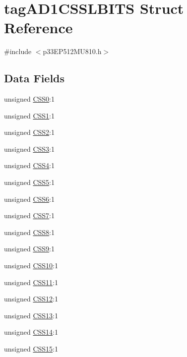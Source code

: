 \hypertarget{structtag_a_d1_c_s_s_l_b_i_t_s}{}\section{tag\+A\+D1\+C\+S\+S\+L\+B\+I\+TS Struct Reference}
\label{structtag_a_d1_c_s_s_l_b_i_t_s}


{\ttfamily \#include $<$p33\+E\+P512\+M\+U810.\+h$>$}

\subsection*{Data Fields}
\begin{DoxyCompactItemize}
\item 
unsigned \hyperlink{structtag_a_d1_c_s_s_l_b_i_t_s_a550f89b8e78dc062f9f5e2f6a3e01778}{C\+S\+S0}\+:1
\item 
unsigned \hyperlink{structtag_a_d1_c_s_s_l_b_i_t_s_a855cc1eab1422768412432673c038cc1}{C\+S\+S1}\+:1
\item 
unsigned \hyperlink{structtag_a_d1_c_s_s_l_b_i_t_s_a9d805aae2fa4e59ac0922b43397c949d}{C\+S\+S2}\+:1
\item 
unsigned \hyperlink{structtag_a_d1_c_s_s_l_b_i_t_s_a76e426ad4aabbc1b95338627a23ae9eb}{C\+S\+S3}\+:1
\item 
unsigned \hyperlink{structtag_a_d1_c_s_s_l_b_i_t_s_a9a9ff2d43720193ba5aec19dbd443d6a}{C\+S\+S4}\+:1
\item 
unsigned \hyperlink{structtag_a_d1_c_s_s_l_b_i_t_s_adb5659778b6f4209b5d2b3668da9fdd1}{C\+S\+S5}\+:1
\item 
unsigned \hyperlink{structtag_a_d1_c_s_s_l_b_i_t_s_acf633c5953f249ad867a0b8adff4d1c3}{C\+S\+S6}\+:1
\item 
unsigned \hyperlink{structtag_a_d1_c_s_s_l_b_i_t_s_ac59b9f66449f06f7d7db89eca887acec}{C\+S\+S7}\+:1
\item 
unsigned \hyperlink{structtag_a_d1_c_s_s_l_b_i_t_s_a867408da1e20ee0ab6e6d649393df325}{C\+S\+S8}\+:1
\item 
unsigned \hyperlink{structtag_a_d1_c_s_s_l_b_i_t_s_a17176813a1966557c22aa21e3d2df8d8}{C\+S\+S9}\+:1
\item 
unsigned \hyperlink{structtag_a_d1_c_s_s_l_b_i_t_s_abe45970478bbe918c58abfc7552ce363}{C\+S\+S10}\+:1
\item 
unsigned \hyperlink{structtag_a_d1_c_s_s_l_b_i_t_s_aae98a27d4f3f2eb23d9b1793d0f2da2c}{C\+S\+S11}\+:1
\item 
unsigned \hyperlink{structtag_a_d1_c_s_s_l_b_i_t_s_a0f0fd17721b012765db8371a457e8a8f}{C\+S\+S12}\+:1
\item 
unsigned \hyperlink{structtag_a_d1_c_s_s_l_b_i_t_s_afbda5ef77af60d2965cd7079f099f89d}{C\+S\+S13}\+:1
\item 
unsigned \hyperlink{structtag_a_d1_c_s_s_l_b_i_t_s_a89250af994a2b9a7759f36e15b8c41b8}{C\+S\+S14}\+:1
\item 
unsigned \hyperlink{structtag_a_d1_c_s_s_l_b_i_t_s_adde564d938af376e76a2d400e47ba78e}{C\+S\+S15}\+:1
\end{DoxyCompactItemize}



